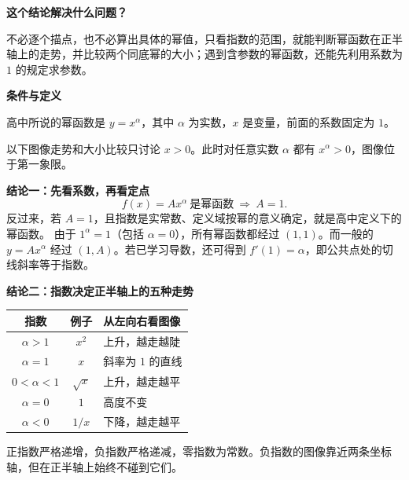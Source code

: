 \begin{statementbox}


  \textbf{\textcolor{CStatement}{这个结论解决什么问题？}}

  不必逐个描点，也不必算出具体的幂值，只看指数的范围，就能判断幂函数在正半轴上的走势，并比较两个同底幂的大小；遇到含参数的幂函数，还能先利用系数为 $1$ 的规定求参数。

  \medskip
  \end{statementbox}\clearpage\begin{statementbox}\textbf{\textcolor{CStatement}{条件与定义}}
  \begin{description}[style=nextline,leftmargin=2.8em,labelsep=0.5em,itemsep=0.35em]
    \item[条件1：] 高中所说的幂函数是 $y=x^\alpha$，其中 $\alpha$ 为实数，$x$ 是变量，前面的系数固定为 $1$。
    \item[条件2：] 以下图像走势和大小比较只讨论 $x>0$。此时对任意实数 $\alpha$ 都有 $x^\alpha>0$，图像位于第一象限。
  \end{description}
  \textbf{\textcolor{CStatement}{结论一：先看系数，再看定点}}
  \[
     f(x)=A x^\alpha\ \text{是幂函数}\ \Longrightarrow\ A=1.
  \]
  反过来，若 $A=1$，且指数是实常数、定义域按幂的意义确定，就是高中定义下的幂函数。
  由于 $1^\alpha=1$（包括 $\alpha=0$），所有幂函数都经过 $(1,1)$。而一般的 $y=Ax^\alpha$ 经过 $(1,A)$。若已学习导数，还可得到 $f'(1)=\alpha$，即公共点处的切线斜率等于指数。

  \medskip
  \end{statementbox}\clearpage\begin{statementbox}

\textbf{\textcolor{CStatement}{结论二：指数决定正半轴上的五种走势}}

  \begin{center}
  \renewcommand{\arraystretch}{1.35}
  \begin{tabular}{c|c|l}
  指数 & 例子 & 从左向右看图像\\ \hline
  $\alpha>1$ & $x^2$ & 上升，越走越陡\\
  $\alpha=1$ & $x$ & 斜率为 $1$ 的直线\\
  $0<\alpha<1$ & $\sqrt{x}$ & 上升，越走越平\\
  $\alpha=0$ & $1$ & 高度不变\\
  $\alpha<0$ & $1/x$ & 下降，越走越平
  \end{tabular}
  \end{center}
  正指数严格递增，负指数严格递减，零指数为常数。负指数的图像靠近两条坐标轴，但在正半轴上始终不碰到它们。


\end{statementbox}
